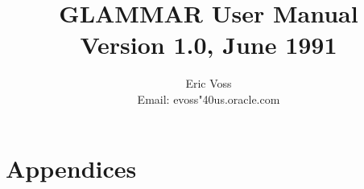 %
%
%
%
\newcommand{\g}{{\sc glammar }}
%
\def\I{\index}

\makeindex
\title
{{\Huge \bf GLAMMAR  User Manual}\\[2ex]
Version 1.0, June 1991}
\author{{\Large Eric Voss}\\[3ex]
Email: evoss\char"40us.oracle.com}

\textheight 21cm
\topmargin 1cm
%
% 

\maketitle
%
%

%





\nocite{Alb86}
\nocite{Att88}
\nocite{Cou82b}
\nocite{Cou84}
\nocite{Cro72}
\nocite{Dem77}
\nocite{Der88b}
\nocite{Fra88b}
\nocite{Gan84}
\nocite{Gie88}
\nocite{Gra80}
\nocite{Jaz81b}
\nocite{Kat84a}
\nocite{Knu68}
\nocite{Knu71a}
\nocite{Kon82}
\nocite{Kon88}
\nocite{Kos69}
\nocite{Kos71a}
\nocite{Kos75}
\nocite{Kos85}
\nocite{Kuh78}
\nocite{Lan90}
\nocite{Leo87}
\nocite{Meij80}
\nocite{Meij86}
\nocite{Meij90}
\nocite{Mil77b}
\nocite{Mor88b}
\nocite{Nes83}
\nocite{Nie84}
\nocite{Osb89}
\nocite{Pag79}
\nocite{Pap81}
\nocite{Pen86}
\nocite{Sim86}
\nocite{Son85}
\nocite{Vog89}
\nocite{Wat74}
\nocite{Yeh88b}
\nocite{Yel86}
\nocite{Yel88}
\nocite{Zwo90}
\chapter*{Appendices}
\appendix
\newpage

\newpage

\newpage




\chapter*{}


